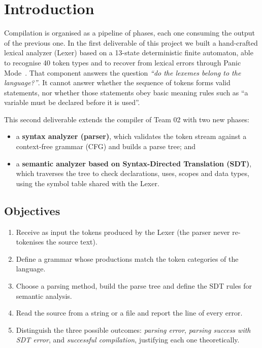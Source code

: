\documentclass[11pt,a4paper]{article}
\begin{document}
    
    \newpage

\tableofcontents
\newpage

\section{Introduction}
Compilation is organised as a pipeline of phases, each one consuming the output of the previous one. In the first deliverable of this project we built a hand-crafted lexical analyzer (Lexer) based on a 13-state deterministic finite automaton, able to recognise 40 token types and to recover from lexical errors through Panic Mode~\cite{lexer-report}. That component answers the question \emph{``do the lexemes belong to the language?''}. It cannot answer whether the sequence of tokens forms valid statements, nor whether those statements obey basic meaning rules such as ``a variable must be declared before it is used''.

This second deliverable extends the compiler of Team 02 with two new phases:
\begin{itemize}[noitemsep]
  \item a \textbf{syntax analyzer (parser)}, which validates the token stream against a context-free grammar (CFG) and builds a parse tree; and
  \item a \textbf{semantic analyzer based on Syntax-Directed Translation (SDT)}, which traverses the tree to check declarations, uses, scopes and data types, using the symbol table shared with the Lexer.
\end{itemize}

\subsection{Objectives}
\begin{enumerate}[noitemsep]
  \item Receive as input the tokens produced by the Lexer (the parser never re-tokenises the source text).
  \item Define a grammar whose productions match the token categories of the language.
  \item Choose a parsing method, build the parse tree and define the SDT rules for semantic analysis.
  \item Read the source from a string or a file and report the line of every error.
  \item Distinguish the three possible outcomes: \emph{parsing error}, \emph{parsing success with SDT error}, and \emph{successful compilation}, justifying each one theoretically.
\end{enumerate}
\end{document}
